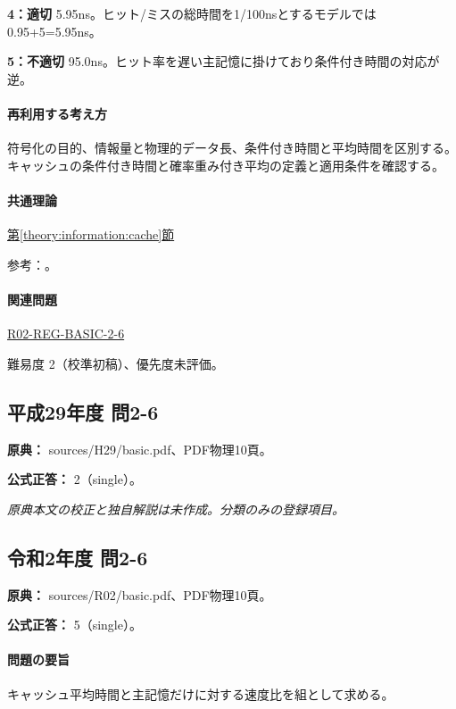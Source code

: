 \noindent\textbf{4：適切} 5.95ns。ヒット/ミスの総時間を1/100nsとするモデルでは0.95+5=\allowbreak{}5.95ns。\par

\noindent\textbf{5：不適切} 95.0ns。ヒット率を遅い主記憶に掛けており条件付き時間の対応が逆。\par

\paragraph{再利用する考え方} 符号化の目的、情報量と物理的データ長、条件付き時間と平均時間を区別する。キャッシュの条件付き時間と確率重み付き平均の定義と適用条件を確認する。

\paragraph{共通理論} \hyperref[theory:information:cache]{第\ref*{theory:information:cache}節}

\par 参考：\cite{info_cache}。

\paragraph{関連問題} \hyperref[q:r02-reg-basic-2-6]{R02-REG-BASIC-2-6}

\par 難易度 2（校準初稿）、優先度未評価。

\subsection{平成29年度 問2-6}
\label{q:h29-reg-basic-2-6}

\noindent\textbf{原典：} sources/H29/basic.pdf、PDF物理10頁。

\textbf{公式正答：} 2（single）。

\par\textit{原典本文の校正と独自解説は未作成。分類のみの登録項目。}

\subsection{令和2年度 問2-6}
\label{q:r02-reg-basic-2-6}

\noindent\textbf{原典：} sources/R02/basic.pdf、PDF物理10頁。

\textbf{公式正答：} 5（single）。

\paragraph{問題の要旨} キャッシュ平均時間と主記憶だけに対する速度比を組として求める。


